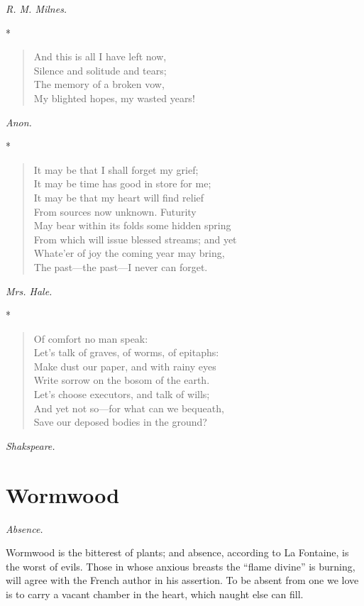 \documentclass[11pt,twoside]{article}
\newcommand\flower[2]{\section*{#1}\addcontentsline{toc}{section}{#1}%
  \noindent\textit{#2.}\par\medskip}
\newcommand\stars{\begin{center}*\quad*\quad*\end{center}}
\newcommand\by[1]{\par\hfill\textit{#1}\par}
\begin{document}
\by{R. M. Milnes.}

\stars

\begin{verse}
And this is all I have left now,\\
\quad Silence and solitude and tears;\\
The memory of a broken vow,\\
\quad My blighted hopes, my wasted years!
\end{verse}

\by{Anon.}

\stars

\begin{verse}
It may be that I shall forget my grief;\\
\quad It may be time has good in store for me;\\
It may be that my heart will find relief\\
\quad From sources now unknown. Futurity\\
May bear within its folds some hidden spring\\
\quad From which will issue blessed streams; and yet\\
Whate’er of joy the coming year may bring,\\
\quad The past---the past---I never can forget.
\end{verse}

\by{Mrs. Hale.}

\stars

\begin{verse}
\quad Of comfort no man speak:\\
Let’s talk of graves, of worms, of epitaphs:\\
Make dust our paper, and with rainy eyes\\
Write sorrow on the bosom of the earth.\\
Let’s choose executors, and talk of wills;\\
And yet not so---for what can we bequeath,\\
Save our deposed bodies in the ground?
\end{verse}

\by{Shakspeare.}

\flower{Wormwood}{Absence}

Wormwood is the bitterest of plants; and absence, according to La Fontaine, is the worst of evils. Those in whose anxious breasts the “flame divine” is burning, will agree with the French author in his assertion. To be absent from one we love is to carry a vacant chamber in the heart, which naught else can fill.
\end{document}
